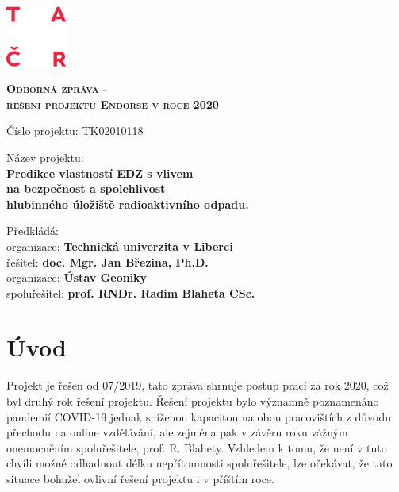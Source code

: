 \documentclass[11pt,a4paper]{article}
\begin{document}
\begin{onehalfspacing} 


\begin{titlepage}
    \includegraphics[width=2cm]{logo_TACR_zakl.pdf}

    \vspace{5cm}
    {\centering	
      {\scshape\bf\huge Odborná zpráva - \\
      řešení projektu Endorse v roce 2020\par}
    }
	
    \vspace{3cm}	
    {\LARGE
      {\noindent Číslo projektu:  TK02010118
        {\bfseries }\par}
      \vspace{2ex}
      {\noindent Název projektu: \\
        {\bfseries Predikce vlastností EDZ s vlivem \\
        na bezpečnost a spolehlivost\\
         hlubinného úložiště radioaktivního odpadu.} \par}
      \vspace{2ex}
      {\noindent Předkládá: \\
      \-\hspace{2ex} organizace: {\bfseries Technická univerzita v Liberci}\\
      \-\hspace{2ex} řešitel: {\bfseries doc. Mgr. Jan Březina, Ph.D.}\\
      \-\hspace{2ex} organizace: {\bfseries Ústav Geoniky}\\
      \-\hspace{2ex} spoluřešitel: {\bfseries prof. RNDr. Radim Blaheta CSc.}\par}

    }  
    \vfill
\end{titlepage}



\section{Úvod}
Projekt je řešen od 07/2019, tato zpráva shrnuje postup prací za rok 2020, což byl druhý rok řešení projektu. Řešení projektu bylo významně poznamenáno pandemií COVID-19 jednak sníženou kapacitou na obou pracovištích z důvodu přechodu na online vzdělávání, ale zejména pak v závěru roku vážným onemocněním spoluřešitele, prof. R. Blahety. Vzhledem k tomu, že není v tuto chvíli možné odhadnout délku nepřítomnosti spoluřešitele, lze očekávat, že tato situace bohužel ovlivní řešení projektu i v příštím roce. 



\end{onehalfspacing}
\end{document}
